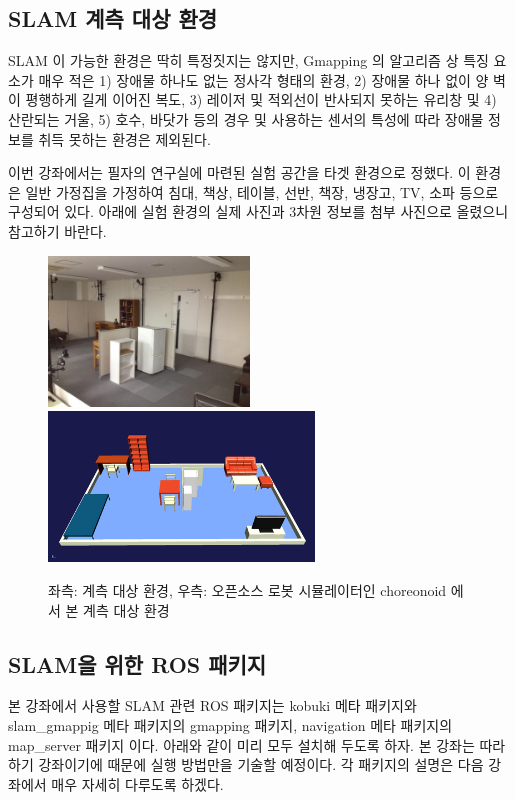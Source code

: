 \subsection{SLAM 계측 대상 환경}

SLAM 이 가능한 환경은 딱히 특정짓지는 않지만, Gmapping 의 알고리즘 상 특징 요소가 매우 적은 1) 장애물 하나도 없는 정사각 형태의 환경, 2) 장애물 하나 없이 양 벽이 평행하게 길게 이어진 복도, 3) 레이저 및 적외선이 반사되지 못하는 유리창 및 4) 산란되는 거울, 5) 호수, 바닷가 등의 경우 및 사용하는 센서의 특성에 따라 장애물 정보를 취득 못하는 환경은 제외된다.

이번 강좌에서는 필자의 연구실에 마련된 실험 공간을 타겟 환경으로 정했다. 이 환경은 일반 가정집을 가정하여 침대, 책상, 테이블, 선반, 책장, 냉장고, TV, 소파 등으로 구성되어 있다. 아래에 실험 환경의 실제 사진과 3차원 정보를 첨부 사진으로 올렸으니 참고하기 바란다. 

\begin{figure}[h]
\centering
\includegraphics[height=40mm]{pictures/chapter11/room.jpg}
\includegraphics[height=40mm]{pictures/chapter11/room_choreonoid.png}
\caption{좌측: 계측 대상 환경, 우측: 오픈소스 로봇 시뮬레이터인 choreonoid 에서 본 계측 대상 환경}
\end{figure}

\subsection{SLAM을 위한 ROS 패키지}

본 강좌에서 사용할 SLAM 관련 ROS 패키지는 kobuki 메타 패키지와 slam\_gmappig 메타 패키지의 gmapping 패키지, navigation 메타 패키지의 map\_server 패키지 이다. 아래와 같이 미리 모두 설치해 두도록 하자. 본 강좌는 따라하기 강좌이기에 때문에 실행 방법만을 기술할 예정이다. 각 패키지의 설명은 다음 강좌에서 매우 자세히 다루도록 하겠다. 

